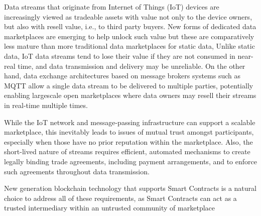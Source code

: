 \documentclass[12pt]{article}
\begin{document}
Data streams that originate from Internet of Things (IoT)
devices are increasingly viewed as tradeable assets with value
not only to the device owners, but also with resell value,
i.e., to third party buyers. New forms of dedicated data
marketplaces are emerging to help unlock such value
but these are comparatively less mature than more traditional
data marketplaces for static data, Unlike static data, IoT data streams tend
to lose their value if they are not consumed in near-real time,
and data transmission and delivery may be unreliable. On the
other hand, data exchange architectures based on message
brokers systems such as MQTT allow a single data stream
to be delivered to multiple parties, potentially enabling largescale open marketplaces where data owners may resell their
streams in real-time multiple times.\par While the IoT network
and message-passing infrastructure can support a scalable
marketplace, this inevitably leads to issues of mutual trust
amongst participants, especially when those have no prior
reputation within the marketplace. Also, the short-lived nature of streams requires efficient, automated mechanisms to
create legally binding trade agreements, including payment
arrangements, and to enforce such agreements throughout
data transmission.\par
New generation blockchain technology that supports
Smart Contracts is a natural choice to address all of these
requirements, as Smart Contracts can act as a trusted intermediary within an untrusted community of marketplace
\end{document}
